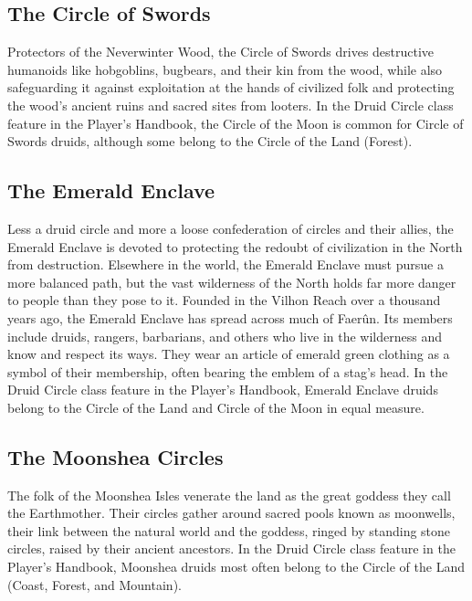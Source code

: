 \documentclass[10pt,a4paper,twoside,twocolumn,openany,bg=print,nodeprecatedcode]{dndbook}
\begin{document}
\subsection{The Circle of Swords}
Protectors of the Neverwinter Wood, the Circle of Swords drives destructive humanoids like hobgoblins, bugbears, and their kin from the wood, while also safeguarding it against exploitation at the hands of civilized folk and protecting the wood's ancient ruins and sacred sites from looters.
In the Druid Circle class feature in the Player's Handbook, the Circle of the Moon is common for Circle of Swords druids, although some belong to the Circle of the Land (Forest).
\subsection{The Emerald Enclave}
Less a druid circle and more a loose confederation of circles and their allies, the Emerald Enclave is devoted to protecting the redoubt of civilization in the North from destruction. Elsewhere in the world, the Emerald Enclave must pursue a more balanced path, but the vast wilderness of the North holds far more danger to people than they pose to it.
Founded in the Vilhon Reach over a thousand years ago, the Emerald Enclave has spread across much of Faerûn. Its members include druids, rangers, barbarians, and others who live in the wilderness and know and respect its ways. They wear an article of emerald green clothing as a symbol of their membership, often bearing the emblem of a stag's head.
In the Druid Circle class feature in the Player's Handbook, Emerald Enclave druids belong to the Circle of the Land and Circle of the Moon in equal measure.
\subsection{The Moonshea Circles}
The folk of the Moonshea Isles venerate the land as the great goddess they call the Earthmother. Their circles gather around sacred pools known as moonwells, their link between the natural world and the goddess, ringed by standing stone circles, raised by their ancient ancestors.
In the Druid Circle class feature in the Player's Handbook, Moonshea druids most often belong to the Circle of the Land (Coast, Forest, and Mountain).
\end{document}
